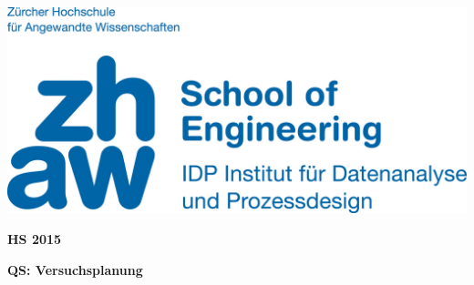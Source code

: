 \noindent
\begin{minipage}[t]{0.4\textwidth} 
\includegraphics[width=\linewidth]{logo.jpg}
\end{minipage}%
\hfill%
\begin{minipage}[t]{0.4\textwidth}\raggedleft
\textbf{\large HS 2015}
\end{minipage}

\begin{center}
 \textbf{\large QS: Versuchsplanung} \\
 \vspace{0.3cm}
\end{center}
